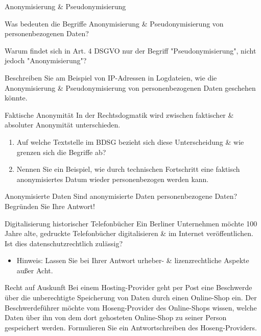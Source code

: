 \documentclass{exercisesheet}
\begin{document}
\begin{exercise}{Anonymisierung \& Pseudonymisierung}
  \item Was bedeuten die Begriffe Anonymisierung \& Pseudonymisierung von personenbezogenen Daten?
  \item Warum findet sich in Art. 4 DSGVO nur der Begriff "Pseudonymisierung", nicht jedoch "Anonymisierung"?
  \item Beschreiben Sie am Beispiel von IP-Adressen in Logdateien, wie die Anonymisierung \& Pseudonymisierung von personenbezogenen Daten geschehen könnte.
\end{exercise}

\begin{exercise*}{Faktische Anonymität}
  In der Rechtsdogmatik wird zwischen faktischer \& absoluter Anonymität unterschieden.
  \begin{enumerate}
    \item Auf welche Textstelle im BDSG bezieht sich diese Unterscheidung \& wie grenzen sich die Begriffe ab?
    \item Nennen Sie ein Beispiel, wie durch technischen Fortschritt eine faktisch anonymisiertes Datum wieder personenbezogen werden kann.
  \end{enumerate}
\end{exercise*}

\begin{exercise*}{Anonymisierte Daten}
  Sind anonymisierte Daten personenbezogene Daten? Begründen Sie Ihre Antwort!
\end{exercise*}

\begin{exercise*}{Digitalisierung historischer Telefonbücher}
  Ein Berliner Unternehmen möchte 100 Jahre alte, gedruckte Telefonbücher digitalisieren \& im Internet veröffentlichen. Ist dies datenschutzrechtlich zulässig?
  \begin{itemize}
    \item Hinweis: Lassen Sie bei Ihrer Antwort urheber- \& lizenzrechtliche Aspekte außer Acht.
  \end{itemize}
\end{exercise*}

\begin{exercise*}{Recht auf Auskunft}
  Bei einem Hosting-Provider geht per Post eine Beschwerde über die unberechtigte Speicherung von Daten durch einen Online-Shop ein. Der Beschwerdeführer möchte vom Hoseng-Provider des Online-Shops wissen, welche Daten über ihn von dem dort gehosteten Online-Shop zu seiner Person gespeichert werden. Formulieren Sie ein Antwortschreiben des Hoseng-Providers.
\end{exercise*}
\end{document}
